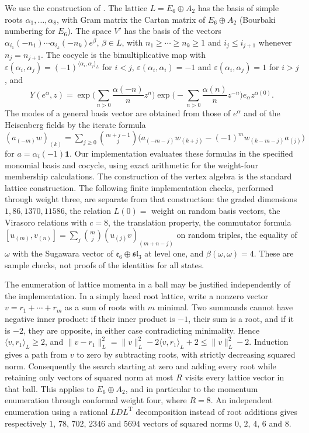 \documentclass[leqno]{article}
\renewcommand{\leq}{\ensuremath{\leqslant}}
\renewcommand{\geq}{\ensuremath{\geqslant}}
\newcommand{\epsi}{\varepsilon}
\numberwithin{equation}{section}
\begin{document}
We use the construction of \cite[Chapter 8]{FLM88}. The lattice $L = E_6 \oplus A_2$ has the basis of simple roots $\alpha_1,\ldots,\alpha_8$, with Gram matrix the Cartan matrix of $E_6 \oplus A_2$ (Bourbaki numbering for $E_6$). The space $V'$ has the basis of the vectors $\alpha_{i_1}(-n_1)\cdots\alpha_{i_k}(-n_k)e^\beta$, $\beta \in L$, with $n_1 \geq \cdots \geq n_k \geq 1$ and $i_j \leq i_{j+1}$ whenever $n_j = n_{j+1}$. The cocycle is the bimultiplicative map with $\epsi(\alpha_i,\alpha_j) = (-1)^{\langle\alpha_i,\alpha_j\rangle_L}$ for $i<j$, $\epsi(\alpha_i,\alpha_i) = -1$ and $\epsi(\alpha_i,\alpha_j) = 1$ for $i>j$, and
\begin{equation}
\label{eq:vertex-op}
Y(e^\alpha,z) = \exp\Big(\sum_{n>0}\frac{\alpha(-n)}{n}z^n\Big)\exp\Big(-\sum_{n>0}\frac{\alpha(n)}{n}z^{-n}\Big)e_\alpha z^{\alpha(0)}.
\end{equation}
The modes of a general basis vector are obtained from those of $e^\alpha$ and of the Heisenberg fields by the iterate formula $(a_{(-m)}w)_{(k)} = \sum_{j \geq 0}\binom{m+j-1}{j}\big(a_{(-m-j)}w_{(k+j)}-(-1)^mw_{(k-m-j)}a_{(j)}\big)$ for $a = \alpha_i(-1)\mathbf 1$. Our implementation evaluates these formulas in the specified monomial basis and cocycle, using exact arithmetic for the weight-four membership calculations. The construction of the vertex algebra is the standard lattice construction. The following finite implementation checks, performed through weight three, are separate from that construction: the graded dimensions $1, 86, 1370, 11586$, the relation $L(0) = $ weight on random basis vectors, the Virasoro relations with $c = 8$, the translation property, the commutator formula $[u_{(m)},v_{(n)}] = \sum_j\binom{m}{j}(u_{(j)}v)_{(m+n-j)}$ on random triples, the equality of $\omega$ with the Sugawara vector of $\mathfrak e_6 \oplus \mathfrak{sl}_3$ at level one, and $\beta(\omega,\omega) = 4$. These are sample checks, not proofs of the identities for all states.

The enumeration of lattice momenta in a ball may be justified independently of the implementation. In a simply laced root lattice, write a nonzero vector $v = r_1+\cdots+r_m$ as a sum of roots with $m$ minimal. Two summands cannot have negative inner product: if their inner product is $-1$, their sum is a root, and if it is $-2$, they are opposite, in either case contradicting minimality. Hence $\langle v,r_1\rangle_L \geq 2$, and $\|v-r_1\|_L^2 = \|v\|_L^2-2\langle v,r_1\rangle_L+2 \leq \|v\|_L^2-2$. Induction gives a path from $v$ to zero by subtracting roots, with strictly decreasing squared norm. Consequently the search starting at zero and adding every root while retaining only vectors of squared norm at most $R$ visits every lattice vector in that ball. This applies to $E_6 \oplus A_2$, and in particular to the momentum enumeration through conformal weight four, where $R = 8$. An independent enumeration using a rational $LDL^{\mathrm T}$ decomposition instead of root additions gives respectively $1$, $78$, $702$, $2346$ and $5694$ vectors of squared norms $0$, $2$, $4$, $6$ and $8$.
\end{document}
